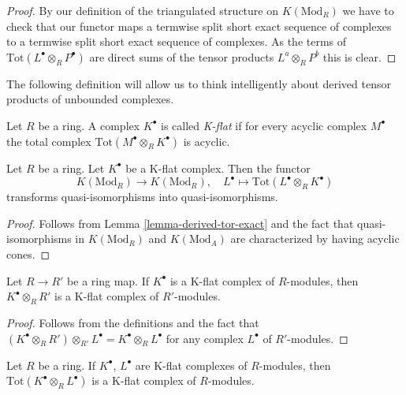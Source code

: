 \begin{proof}
By our definition of the triangulated structure on
$K(\text{Mod}_R)$ we have to check that our functor maps
a termwise split short exact sequence of complexes to a termwise
split short exact sequence of complexes. As the terms of
$\text{Tot}(L^\bullet \otimes_R P^\bullet)$ are direct sums
of the tensor products $L^a \otimes_R P^b$ this is clear.
\end{proof}

\noindent
The following definition will allow us to think intelligently
about derived tensor products of unbounded complexes.

\begin{definition}
\label{definition-K-flat}
Let $R$ be a ring. A complex $K^\bullet$ is called {\it K-flat}
if for every acyclic complex $M^\bullet$ the total complex
$\text{Tot}(M^\bullet \otimes_R K^\bullet)$ is acyclic.
\end{definition}

\begin{lemma}
\label{lemma-K-flat-quasi-isomorphism}
Let $R$ be a ring. Let $K^\bullet$ be a K-flat complex.
Then the functor
$$
K(\text{Mod}_R) \longrightarrow K(\text{Mod}_R), \quad
L^\bullet \longmapsto \text{Tot}(L^\bullet \otimes_R K^\bullet)
$$
transforms quasi-isomorphisms into quasi-isomorphisms.
\end{lemma}

\begin{proof}
Follows from
Lemma \ref{lemma-derived-tor-exact}
and the fact that quasi-isomorphisms in $K(\text{Mod}_R)$ and
$K(\text{Mod}_A)$ are characterized by having acyclic cones.
\end{proof}

\begin{lemma}
\label{lemma-base-change-K-flat}
Let $R \to R'$ be a ring map. If $K^\bullet$ is a K-flat complex
of $R$-modules, then $K^\bullet \otimes_R R'$ is a K-flat complex
of $R'$-modules.
\end{lemma}

\begin{proof}
Follows from the definitions and the fact that
$(K^\bullet \otimes_R R') \otimes_{R'} L^\bullet =
K^\bullet \otimes_R L^\bullet$ for any complex
$L^\bullet$ of $R'$-modules.
\end{proof}

\begin{lemma}
\label{lemma-tensor-product-K-flat}
Let $R$ be a ring. If $K^\bullet$, $L^\bullet$ are K-flat complexes
of $R$-modules, then $\text{Tot}(K^\bullet \otimes_R L^\bullet)$ is a
K-flat complex of $R$-modules.
\end{lemma}

